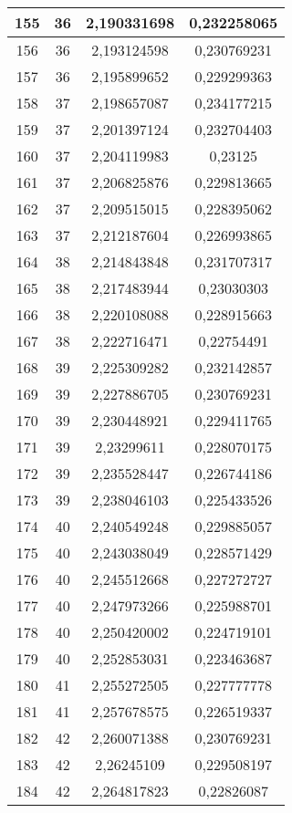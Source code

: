 {\begin{minipage}[!h]{0.45\textwidth}
\begin{longtable}{cccc}
155 & 36 & 2,190331698 & 0,232258065 \\ \hline
156 & 36 & 2,193124598 & 0,230769231 \\ \hline
157 & 36 & 2,195899652 & 0,229299363 \\ \hline
158 & 37 & 2,198657087 & 0,234177215 \\ \hline
159 & 37 & 2,201397124 & 0,232704403 \\ \hline
160 & 37 & 2,204119983 & 0,23125 \\ \hline
161 & 37 & 2,206825876 & 0,229813665 \\ \hline
162 & 37 & 2,209515015 & 0,228395062 \\ \hline
163 & 37 & 2,212187604 & 0,226993865 \\ \hline
164 & 38 & 2,214843848 & 0,231707317 \\ \hline
165 & 38 & 2,217483944 & 0,23030303 \\ \hline
166 & 38 & 2,220108088 & 0,228915663 \\ \hline
167 & 38 & 2,222716471 & 0,22754491 \\ \hline
168 & 39 & 2,225309282 & 0,232142857 \\ \hline
169 & 39 & 2,227886705 & 0,230769231 \\ \hline
170 & 39 & 2,230448921 & 0,229411765 \\ \hline
171 & 39 & 2,23299611 & 0,228070175 \\ \hline
172 & 39 & 2,235528447 & 0,226744186 \\ \hline
173 & 39 & 2,238046103 & 0,225433526 \\ \hline
174 & 40 & 2,240549248 & 0,229885057 \\ \hline
175 & 40 & 2,243038049 & 0,228571429 \\ \hline
176 & 40 & 2,245512668 & 0,227272727 \\ \hline
177 & 40 & 2,247973266 & 0,225988701 \\ \hline
178 & 40 & 2,250420002 & 0,224719101 \\ \hline
179 & 40 & 2,252853031 & 0,223463687 \\ \hline
180 & 41 & 2,255272505 & 0,227777778 \\ \hline
181 & 41 & 2,257678575 & 0,226519337 \\ \hline
182 & 42 & 2,260071388 & 0,230769231 \\ \hline
183 & 42 & 2,26245109 & 0,229508197 \\ \hline
184 & 42 & 2,264817823 & 0,22826087 \\ \hline

\end{longtable}
\end{minipage}}

